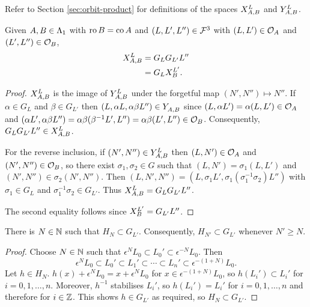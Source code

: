 \documentclass[a4paper, 11pt]{report}
\begin{document}
Refer to Section \ref{sec:orbit-product} for definitions of the spaces $\xprod[L]{A,B}$ and $\yprod[L]{A,B}$.

\begin{lemma}
Given $A,B\in\matrices$ with $\ro{B}=\co{A}$ and $(L,L',L'')\in\flags^3$ with $(L,L')\in\orbit{A}$ and $(L',L'')\in\orbit{B}$,
\begin{align*}
\xprod[L]{A,B}
&= G_L G_{L'} L''\\
&= G_L \xprod[L']{B}.
\end{align*}
\end{lemma}

\begin{proof}
$\xprod[L]{A,B}$ is the image of $\yprod[L]{A,B}$ under the forgetful map $(N',N'')\mapsto N''$. If $\alpha\in G_L$ and $\beta\in G_{L'}$ then $(L,\alpha L,\alpha\beta L'')\in\yprod{A,B}$ since $(L,\alpha L')=\alpha(L,L')\in\orbit{A}$ and $(\alpha L',\alpha\beta L'')=\alpha\beta(\beta^{-1}L',L'')=\alpha\beta(L',L'')\in\orbit{B}$. Consequently, $G_L G_{L'}L''\in\xprod[L]{A,B}$.

For the reverse inclusion, if $(N',N'')\in\yprod[L]{A,B}$ then $(L,N')\in\orbit{A}$ and $(N',N'')\in\orbit{B}$, so there exist $\sigma_1,\sigma_2\in G$ such that $(L,N')=\sigma_1(L,L')$ and $(N',N'')\in\sigma_2(N',N'')$. Then $(L,N',N'') = (L,\sigma_1 L',\sigma_1(\sigma_1^{-1}\sigma_2) L'')$ with $\sigma_1\in G_L$ and $\sigma_1^{-1}\sigma_2\in G_{L'}$. Thus $\xprod[L]{A,B} = G_L G_{L'}L''$.

The second equality follows since $\xprod[L']{B}=G_{L'}L''$.
\end{proof}

\begin{lemma}
There is $N\in\naturals$ such that $H_N\subset G_{L'}$. Consequently, $H_{N'}\subset G_{L'}$ whenever $N'\geq N$.
\end{lemma}

\begin{proof}
Choose $N\in\naturals$ such that $\epsilon^N L_0\subset L_0'\subset \epsilon^{-N}L_0$. Then
\begin{equation*}
\epsilon^N L_0 \subset L_0'\subset L_1'\subset\cdots\subset L_n' \subset \epsilon^{-(1+N)}L_0.
\end{equation*}
Let $h\in H_N$. $h(x) + \epsilon^N L_0 = x + \epsilon^N L_0$ for $x\in\epsilon^{-(1+N)} L_0$, so $h(L_i')\subset L_i'$ for $i=0,1,\ldots,n$. Moreover, $h^{-1}$ stabilises $L_i'$, so $h(L_i') = L_i'$ for $i=0,1,\ldots,n$ and therefore for $i\in\integers$. This shows $h\in G_{L'}$ as required, so $H_N\subset G_{L'}$.
\end{proof}
\end{document}
